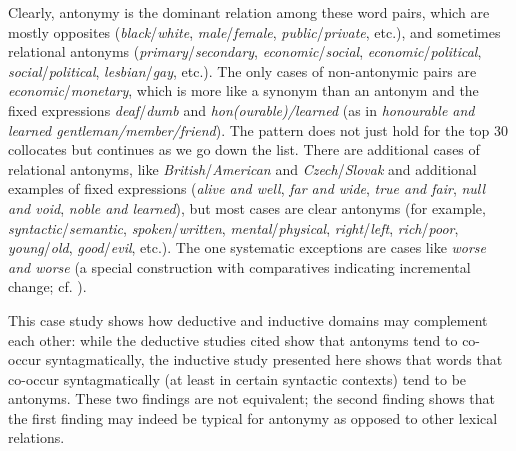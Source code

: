 Clearly, antonymy is the dominant relation among these word pairs, which are mostly opposites (\textit{black}/\textit{white}, \textit{male}/\textit{female}, \textit{public}/\textit{private}, etc.), and sometimes relational antonyms (\textit{primary}/\textit{secondary}, \textit{economic}/\textit{social}, \textit{economic}/\textit{political}, \textit{social}/\textit{political}, \textit{lesbian}/\textit{gay}, etc.). The only cases of non-antonymic pairs are \textit{economic}/\textit{monetary}, which is more like a synonym than an antonym and the fixed expressions \textit{deaf}/\textit{dumb} and \textit{hon(ourable)/learned} (as in \textit{honourable and learned gentleman/member/friend}). The pattern does not just hold for the top 30 collocates but continues as we go down the list. There are additional cases of relational antonyms, like \textit{British}/\textit{American} and \textit{Czech}/\textit{Slovak} and additional examples of fixed expressions (\textit{alive and well}, \textit{far and wide}, \textit{true and fair}, \textit{null and void}, \textit{noble and learned}), but most cases are clear antonyms (for example, \textit{syntactic}/\textit{semantic}, \textit{spoken}/\textit{written}, \textit{mental}/\textit{physical}, \textit{right}/\textit{left}, \textit{rich}/\textit{poor}, \textit{young}/\textit{old}, \textit{good}/\textit{evil}, etc.). The one systematic exceptions are cases like \textit{worse and worse} (a special construction with comparatives indicating incremental change; cf. \citet{stefanowitsch_wortwiederholungen_2007}).

This case study shows how deductive and inductive domains may complement each other: while the deductive studies cited show that antonyms tend to co-occur syntagmatically, the inductive study presented here shows that words that co-occur syntagmatically (at least in certain syntactic contexts) tend to be antonyms. These two findings are not equivalent; the second finding shows that the first finding may indeed be typical for antonymy as opposed to other lexical relations.

